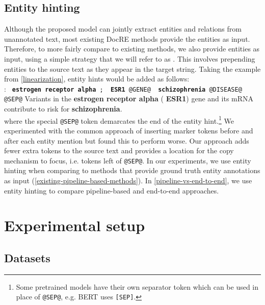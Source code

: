 \documentclass[11pt]{article}
\begin{document}
\subsection{Entity hinting} \label{entity-hinting}

Although the proposed model can jointly extract entities and relations from unannotated text, most existing DocRE methods provide the entities as input. Therefore, to more fairly compare to existing methods, we also provide entities as input, using a simple strategy that we will refer to as . This involves prepending entities to the source text as they appear in the target string. Taking the example from \textsection\ref{linearization}, entity hints would be added as follows:\\

\noindent
{\small
: \texttt{{\color{MyPurple} \textbf{estrogen receptor alpha}} ; {\color{MyPurple} \textbf{ESR1} @GENE@} {\color{MyOrange} \textbf{schizophrenia} @DISEASE@} @SEP@} Variants in the {\color{MyPurple} \textbf{estrogen receptor alpha}} ({\color{MyPurple} \textbf{ESR1}}) gene and its mRNA contribute to risk for {\color{MyOrange} \textbf{schizophrenia}}.
}
\\

\noindent where the special \texttt{@SEP@} token demarcates the end of the entity hint.\footnote{Some pretrained models have their own separator token which can be used in place of \texttt{@SEP@}, e.g. BERT uses \texttt{[SEP]}.} We experimented with the common approach of inserting marker tokens before and after each entity mention \citep{Zhou2021AnIB} but found this to perform worse. Our approach adds fewer extra tokens to the source text and provides a location for the copy mechanism to focus, i.e. tokens left of \texttt{@SEP@}. In our experiments, we use entity hinting when comparing to methods that provide ground truth entity annotations as input (\textsection \ref{existing-pipeline-based-methods}). In \textsection \ref{pipeline-vs-end-to-end}, we use entity hinting to compare pipeline-based and end-to-end approaches.

\section{Experimental setup}

\subsection{Datasets}
\end{document}
